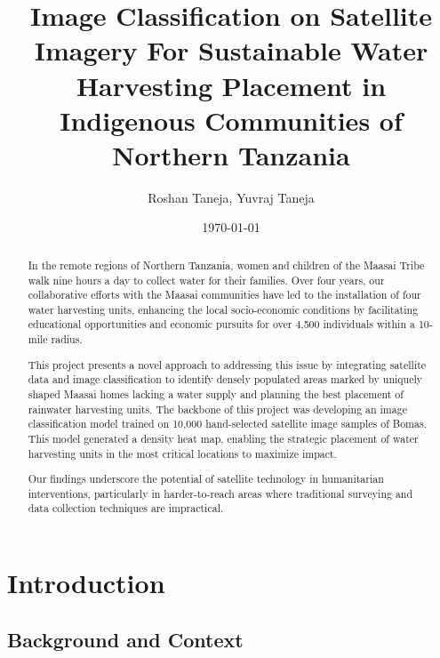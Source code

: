 \documentclass[10pt]{article}
\title{Image Classification on Satellite Imagery For Sustainable Water Harvesting Placement in Indigenous Communities of Northern Tanzania}
\author{Roshan Taneja, Yuvraj Taneja}
\date{\today}
\begin{document}
\maketitle

\begin{abstract}

In the remote regions of Northern Tanzania, women and children of the Maasai Tribe walk nine hours a day to collect water for their families. Over four years, our collaborative efforts with the Maasai communities have led to the installation of four water harvesting units, enhancing the local socio-economic conditions by facilitating educational opportunities and economic pursuits for over 4,500 individuals within a 10-mile radius.

This project presents a novel approach to addressing this issue by integrating satellite data and image classification to identify densely populated areas marked by uniquely shaped Maasai homes lacking a water supply and planning the best placement of rainwater harvesting units. The backbone of this project was developing an image classification model trained on 10,000 hand-selected satellite image samples of Bomas. This model generated a density heat map, enabling the strategic placement of water harvesting units in the most critical locations to maximize impact.

Our findings underscore the potential of satellite technology in humanitarian interventions, particularly in harder-to-reach areas where traditional surveying and data collection techniques are impractical.
    
\end{abstract}


\section{Introduction}

\subsection{Background and Context}
\end{document}

